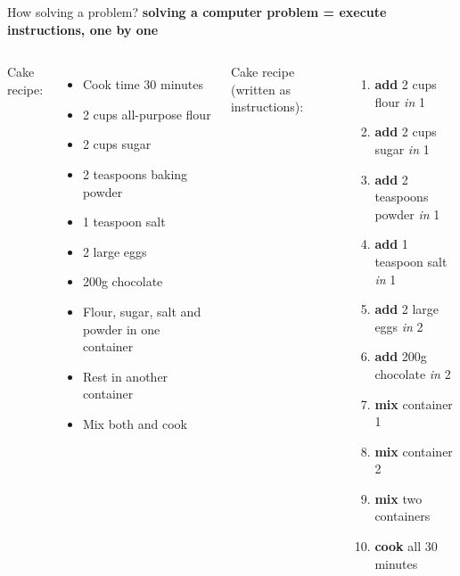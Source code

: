 \documentclass{beamer}[10pt, usepdftitle=false, handout]
\begin{document}
    \begin{frame}[label=(first)]
	
	\begin{block}{How solving a problem?}
	\textbf{solving a computer problem = execute instructions, one by one}
	\end{block}
	
	\vspace*{1em}	
	
	\begin{columns}[c]
	
	Cake recipe:
	\begin{itemize}
	\item{Cook time 30 minutes}
	\item{2 cups all-purpose flour}
	\item{2 cups sugar}
	\item{2 teaspoons baking powder}
	\item{1 teaspoon salt}
	\item{2 large eggs}
	\item{200g chocolate}
	\item{Flour, sugar, salt and powder in one container}
	\item{Rest in another container}
	\item{Mix both and cook}
	\end{itemize}
	\vspace*{1em}	
	
	Cake recipe (written as instructions):	
	
	\begin{enumerate}

	\item{\textbf{add} 2 cups flour \textit{in} 1}
	\item{\textbf{add} 2 cups sugar \textit{in} 1}
	\item{\textbf{add} 2 teaspoons powder \textit{in} 1}
	\item{\textbf{add} 1 teaspoon salt \textit{in} 1}
	\item{\textbf{add} 2 large eggs \textit{in} 2}
	\item{\textbf{add} 200g chocolate \textit{in} 2}
	\item{\textbf{mix} container 1}
	\item{\textbf{mix} container 2}
	\item{\textbf{mix} two containers}
	\item{\textbf{cook} all 30 minutes}
	\end{enumerate}	
	\vspace*{1em}
	
	\end{columns}	
	
    \end{frame}
    
\end{document}
